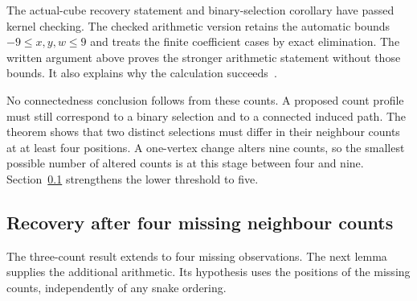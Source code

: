 \documentclass[11pt,a4paper]{article}
\theoremstyle{definition}
\theoremstyle{remark}
\begin{document}
The actual-cube recovery statement and binary-selection corollary have
passed kernel checking. The checked arithmetic version retains the
automatic bounds $-9\le x,y,w\le9$ and treats the finite coefficient
cases by exact elimination. The written argument above proves the
stronger arithmetic statement without those bounds. It also explains
why the calculation succeeds~\cite{research238}.

No connectedness conclusion follows from these counts. A proposed
count profile must still correspond to a binary selection and to a
connected induced path. The theorem shows that two distinct selections
must differ in their neighbour counts at at least four positions.
A one-vertex change alters nine counts, so the smallest possible
number of altered counts is at this stage between four and nine.
Section~\ref{sec:four-erasure239} strengthens the lower threshold to five.

\subsection{Recovery after four missing neighbour counts}
\label{sec:four-erasure239}
The three-count result extends to four missing observations. The next
lemma supplies the additional arithmetic. Its hypothesis uses the
positions of the missing counts, independently of any snake ordering.
\end{document}
